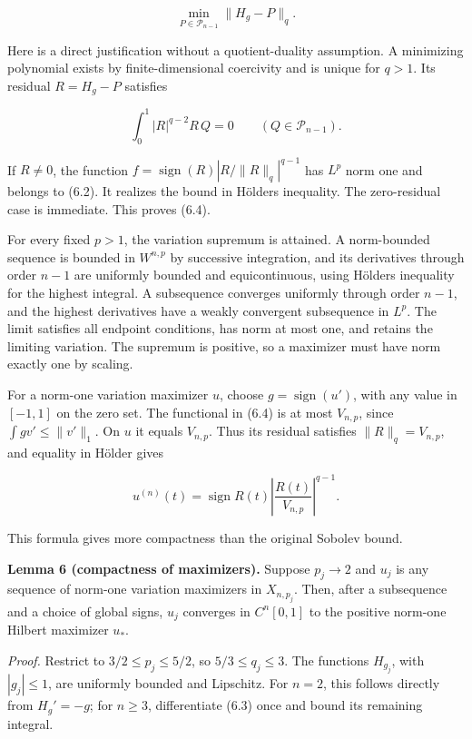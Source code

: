 \documentclass[11pt]{article}
\begin{document}
\[
\min_{P\in\mathcal P_{n-1}}\|H_g-P\|_q.
\tag{6.4}
\]

Here is a direct justification without a quotient-duality assumption. A
minimizing polynomial exists by finite-dimensional coercivity and is
unique for \(q>1\). Its residual \(R=H_g-P\) satisfies

\[
\int_0^1 |R|^{q-2}R\,Q=0\qquad(Q\in\mathcal P_{n-1}).
\tag{6.5}
\]

If \(R\ne0\), the function \(f=\operatorname{sign}(R)|R/\|R\|_q|^{q-1}\)
has \(L^p\) norm one and belongs to (6.2). It realizes the bound in
Hölder\textquotesingle s inequality. The zero-residual case is
immediate. This proves (6.4).

For every fixed \(p>1\), the variation supremum is attained. A
norm-bounded sequence is bounded in \(W^{n,p}\) by successive
integration, and its derivatives through order \(n-1\) are uniformly
bounded and equicontinuous, using Hölder\textquotesingle s inequality
for the highest integral. A subsequence converges uniformly through
order \(n-1\), and the highest derivatives have a weakly convergent
subsequence in \(L^p\). The limit satisfies all endpoint conditions, has
norm at most one, and retains the limiting variation. The supremum is
positive, so a maximizer must have norm exactly one by scaling.

For a norm-one variation maximizer \(u\), choose
\(g=\operatorname{sign}(u')\), with any value in \([-1,1]\) on the zero
set. The functional in (6.4) is at most \(V_{n,p}\), since
\(\int gv'\le\|v'\|_1\). On \(u\) it equals \(V_{n,p}\). Thus its
residual satisfies \(\|R\|_q=V_{n,p}\), and equality in Hölder gives

\[
u^{(n)}(t)=\operatorname{sign}R(t)
\left|\frac{R(t)}{V_{n,p}}\right|^{q-1}.
\tag{6.6}
\]

This formula gives more compactness than the original Sobolev bound.

\textbf{Lemma 6 (compactness of maximizers).} Suppose \(p_j\to2\) and
\(u_j\) is any sequence of norm-one variation maximizers in
\(X_{n,p_j}\). Then, after a subsequence and a choice of global signs,
\(u_j\) converges in \(C^n[0,1]\) to the positive norm-one Hilbert
maximizer \(u_*\).

\emph{Proof.} Restrict to \(3/2\le p_j\le5/2\), so \(5/3\le q_j\le3\).
The functions \(H_{g_j}\), with \(|g_j|\le1\), are uniformly bounded and
Lipschitz. For \(n=2\), this follows directly from \(H_g'=-g\); for
\(n\ge3\), differentiate (6.3) once and bound its remaining integral.
\end{document}
